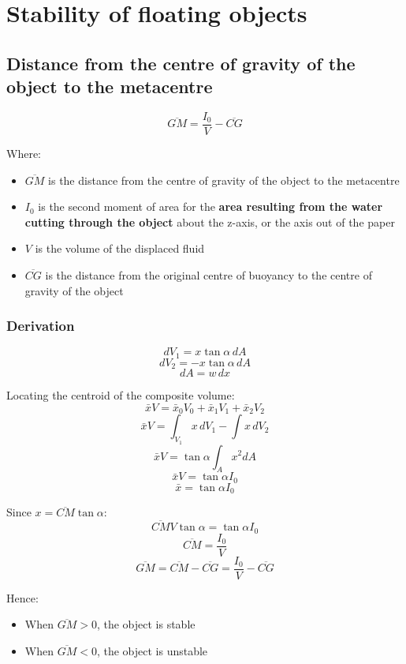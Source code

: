 \documentclass[11pt]{article}
\begin{document}
\newpage

\section{Stability of floating objects}
\label{sec:orgbc51989}

\subsection{Distance from the centre of gravity of the object to the metacentre}
\label{sec:org308ea32}
\[\overline{GM} = \frac{I_0}{V} - \overline{CG}\]

Where:
\begin{itemize}
\item \(\overline{GM}\) is the distance from the centre of gravity of the object to the metacentre
\item \(I_0\) is the second moment of area for the \textbf{area resulting from the water cutting through the object} about the z-axis, or the axis out of the paper
\item \(V\) is the volume of the displaced fluid
\item \(\overline{CG}\) is the distance from the original centre of buoyancy to the centre of gravity of the object
\end{itemize}

\subsubsection{Derivation}
\label{sec:orga8084ec}
\[dV_1 = x \tan \alpha \, dA\]
\[dV_2 = - x \tan \alpha \, dA\]
\[dA = w \, dx\]

Locating the centroid of the composite volume:
\[\bar{x} V = \bar{x}_0 V_0 + \bar{x}_1 V_1 + \bar{x}_2 V_2\]
\[\bar{x} V = \int_{V_1} x \, dV_1 - \int x \, dV_2\]
\[\bar{x} V = \tan \alpha \int_A x^2 dA\]
\[\bar{x} V = \tan \alpha I_0\]
\[\bar{x} = \tan \alpha I_0\]

Since \(x = \overline{CM} \tan \alpha\):
\[\overline{CM} V \tan \alpha = \tan \alpha I_0\]
\[\overline{CM} = \frac{I_0}{V}\]
\[\overline{GM} = \overline{CM} - \overline{CG} = \frac{I_0}{V} - \overline{CG}\]

\newpage

Hence:
\begin{itemize}
\item When \(\overline{GM} > 0\), the object is stable
\item When \(\overline{GM} < 0\), the object is unstable
\end{itemize}
\end{document}
